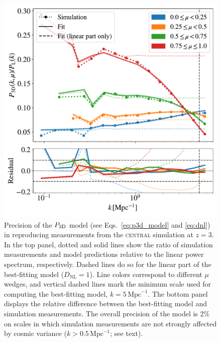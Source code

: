 \documentclass{aa}
\newcommand{\pthreed}{\ensuremath{P_{\rm 3D}}\xspace}
\newcommand{\simcentral}{\textsc{central}\xspace}
\newcommand{\iMpc}{\ensuremath{\,\mathrm{Mpc}^{-1}}}
\begin{document}
\begin{figure}
\includegraphics[width=\columnwidth]{figures/motivate.pdf}
\centering
\caption{Precision of the \pthreed model (see Eqs.~\ref{eq:p3d_model} and \ref{eq:dnl}) in reproducing measurements from the \simcentral simulation at $z=3$. In the top panel, dotted and solid lines show the ratio of simulation measurements and model predictions relative to the linear power spectrum, respectively. Dashed lines do so for the linear part of the best-fitting model ($D_\mathrm{NL}=1$). Line colors correspond to different $\mu$ wedges, and vertical dashed lines mark the minimum scale used for computing the best-fitting model, $k=5\iMpc$. The bottom panel displays the relative difference between the best-fitting model and simulation measurements. The overall precision of the model is 2\% on scales in which simulation measurements are not strongly affected by cosmic variance ($k>0.5\iMpc$; see text).
}
\label{fig:arinyo}
\end{figure}
\end{document}
